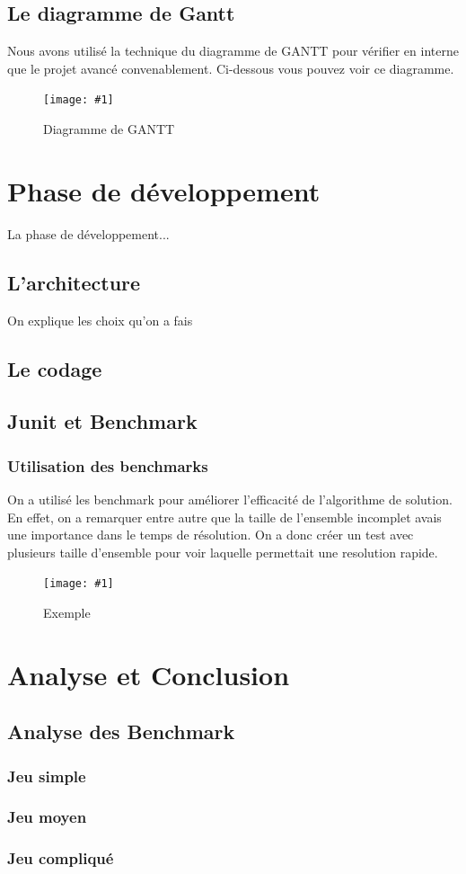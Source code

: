 ﻿\documentclass[a4paper,twoside,12pt]{report}
\newcommand{\monimage}[3]{
\par\noindent
\begin{figure}[H] %
\begin{center}
\texttt{[image: \#1]} %
\caption{#2} %
\label{#3} %
\end{center}
\end{figure} %
}
\begin{document}
\section{Le diagramme de Gantt}
%
Nous avons utilisé la technique du diagramme de GANTT pour vérifier en interne que le projet avancé convenablement. Ci-dessous vous pouvez voir ce
diagramme.
\monimage{DiagrammeDeGantt.pdf}{Diagramme de GANTT}{DG}
\chapter{Phase de développement}
%
La phase de développement...
\section{L'architecture}
On explique les choix qu'on a fais
\section{Le codage}
%
\section{Junit et Benchmark}
%
\subsection{Utilisation des benchmarks}
On a utilisé les benchmark pour améliorer l'efficacité de l'algorithme de solution. En effet, on a remarquer entre autre que la taille de l'ensemble
incomplet avais une importance dans le temps de résolution. On a donc créer un test avec plusieurs taille d'ensemble pour voir laquelle 
permettait une resolution rapide.
\monimage{ensembleincomplettest2.pdf}{Exemple}{EX}
\chapter{Analyse et Conclusion}
%
\section{Analyse des Benchmark}
%
\subsection{Jeu simple}
%
\subsection{Jeu moyen}
%
\subsection{Jeu compliqué}
%
\end{document}
